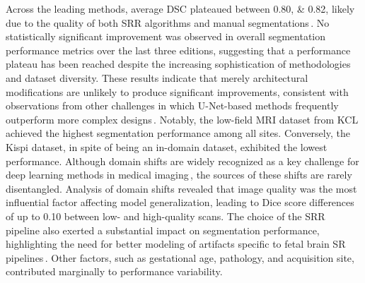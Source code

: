 Across the leading methods, average DSC plateaued between \numlist{0.80;0.82}, likely due to the quality of both SRR algorithms and manual segmentations\,\cite{FeTA2022_review}. No statistically significant improvement was observed in overall segmentation performance metrics over the last three editions, suggesting that a performance plateau has been reached despite the increasing sophistication of methodologies and dataset diversity. These results indicate that merely architectural modifications are unlikely to produce significant improvements, consistent with observations from other challenges in which U-Net-based methods frequently outperform more complex designs\,\cite{Eisenmann2023, FeTA2024_review}. Notably, the low-field MRI dataset from KCL achieved the highest segmentation performance among all sites. Conversely, the Kispi dataset, in spite of being an in-domain dataset, exhibited the lowest performance. Although domain shifts are widely recognized as a key challenge for deep learning methods in medical imaging\,\cite{Dockes2021}, the sources of these shifts are rarely disentangled. Analysis of domain shifts revealed that image quality was the most influential factor affecting model generalization, leading to Dice score differences of up to \num{0.10} between low- and high-quality scans. The choice of the SRR pipeline also exerted a substantial impact on segmentation performance, highlighting the need for better modeling of artifacts specific to fetal brain SR pipelines\,\cite{Sanchez2024}. Other factors, such as gestational age, pathology, and acquisition site, contributed marginally to performance variability.

